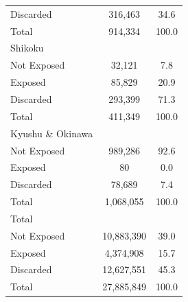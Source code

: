 \begin{table}[htbp]
\begin{tabular}{l*{1}{cc}}
Discarded   &     316,463&        34.6\\
Total       &     914,334&       100.0\\
\midrule
Shikoku     &            &            \\
Not Exposed &      32,121&         7.8\\
Exposed     &      85,829&        20.9\\
Discarded   &     293,399&        71.3\\
Total       &     411,349&       100.0\\
\midrule
Kyushu \& Okinawa &            &            \\
Not Exposed &     989,286&        92.6\\
Exposed     &          80&         0.0\\
Discarded   &      78,689&         7.4\\
Total       &   1,068,055&       100.0\\
\midrule
Total       &            &            \\
Not Exposed &  10,883,390&        39.0\\
Exposed     &   4,374,908&        15.7\\
Discarded   &  12,627,551&        45.3\\
Total       &  27,885,849&       100.0\\
\bottomrule
\end{tabular}
\end{table}
